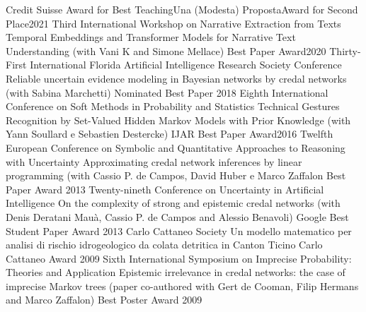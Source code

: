 \begin{cvhonors}
\cvhonor
{Credit Suisse Award for Best Teaching}{Una (Modesta) Proposta}{Award for Second Place}{2021}
\cvhonor
{Third International Workshop on Narrative Extraction from Texts}
{Temporal Embeddings and Transformer Models for Narrative Text Understanding (with Vani K and Simone Mellace)}
{Best Paper Award}{2020}
\cvhonor 
{Thirty-First International Florida Artificial Intelligence Research Society Conference}
{Reliable uncertain evidence modeling in Bayesian networks by credal networks (with Sabina Marchetti)}
{Nominated Best Paper}
{2018}
\cvhonor 
{Eighth International Conference on Soft Methods in Probability and Statistics}
{Technical Gestures Recognition by Set-Valued Hidden Markov Models with Prior Knowledge (with Yann Soullard e Sebastien Destercke)}
{IJAR Best Paper Award}{2016}
\cvhonor
{Twelfth European Conference on Symbolic and Quantitative Approaches to Reasoning with Uncertainty}
{Approximating credal network inferences by linear programming (with Cassio P. de Campos, David Huber e Marco Zaffalon}
{Best Paper Award}
{2013}
\cvhonor
{Twenty-nineth Conference on Uncertainty in Artificial Intelligence}
{On the complexity of strong and epistemic credal networks
(with Denis Deratani Mau\`a, Cassio P. de Campos and Alessio Benavoli)}
{Google Best Student Paper Award}
{2013}
\cvhonor
{Carlo Cattaneo Society}
{Un modello matematico per analisi di rischio idrogeologico da colata detritica in Canton Ticino}
{Carlo Cattaneo Award}
{2009}
\cvhonor
{Sixth International Symposium on Imprecise Probability: Theories and Application}
{Epistemic irrelevance in credal networks: the case of imprecise Markov trees (paper co-authored with Gert de Cooman, Filip Hermans and Marco Zaffalon)}
{Best Poster Award}
{2009}
\end{cvhonors}
\newpage
